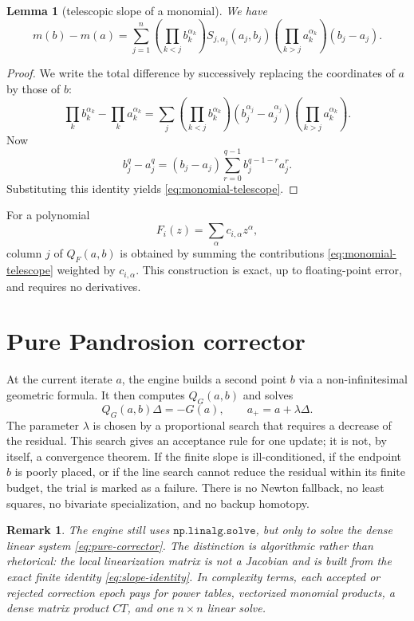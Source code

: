 \documentclass[11pt,a4paper]{article}
\newtheorem{lemma}{Lemma}
\newtheorem{remark}{Remark}
\begin{document}
\begin{lemma}[telescopic slope of a monomial]
We have
\begin{equation}
  m(b)-m(a)=\sum_{j=1}^n
  \left(\prod_{k<j} b_k^{\alpha_k}\right)
  S_{j,\alpha_j}(a_j,b_j)
  \left(\prod_{k>j} a_k^{\alpha_k}\right)
  (b_j-a_j).
  \label{eq:monomial-telescope}
\end{equation}
\end{lemma}

\begin{proof}
We write the total difference by successively replacing the coordinates of \(a\) by those of \(b\):
\[
  \prod_k b_k^{\alpha_k}-\prod_k a_k^{\alpha_k}
  =\sum_j
  \left(\prod_{k<j} b_k^{\alpha_k}\right)
  (b_j^{\alpha_j}-a_j^{\alpha_j})
  \left(\prod_{k>j} a_k^{\alpha_k}\right).
\]
Now
\[
  b_j^q-a_j^q=(b_j-a_j)\sum_{r=0}^{q-1}b_j^{q-1-r}a_j^r.
\]
Substituting this identity yields \eqref{eq:monomial-telescope}.
\end{proof}

For a polynomial
\[
  F_i(z)=\sum_\alpha c_{i,\alpha}z^\alpha,
\]
column \(j\) of \(Q_F(a,b)\) is obtained by summing the contributions \eqref{eq:monomial-telescope} weighted by \(c_{i,\alpha}\). This construction is exact, up to floating-point error, and requires no derivatives.

\section{Pure Pandrosion corrector}
At the current iterate \(a\), the engine builds a second point \(b\) via a non-infinitesimal geometric formula. It then computes \(Q_G(a,b)\) and solves
\begin{equation}
  Q_G(a,b)\Delta=-G(a),
  \qquad a_{+}=a+\lambda\Delta.
  \label{eq:pure-corrector}
\end{equation}
The parameter \(\lambda\) is chosen by a proportional search that requires a decrease of the residual. This search gives an acceptance rule for one update; it is not, by itself, a convergence theorem. If the finite slope is ill-conditioned, if the endpoint \(b\) is poorly placed, or if the line search cannot reduce the residual within its finite budget, the trial is marked as a failure. There is no Newton fallback, no least squares, no bivariate specialization, and no backup homotopy.

\begin{remark}
The engine still uses \(\texttt{np.linalg.solve}\), but only to solve the dense linear system \eqref{eq:pure-corrector}. The distinction is algorithmic rather than rhetorical: the local linearization matrix is not a Jacobian and is built from the exact finite identity \eqref{eq:slope-identity}. In complexity terms, each accepted or rejected correction epoch pays for power tables, vectorized monomial products, a dense matrix product \(C T\), and one \(n\times n\) linear solve.
\end{remark}
\end{document}
